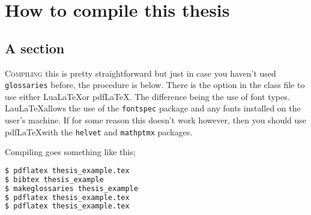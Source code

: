 
\chapter{How to compile this thesis}
\section{A section}

\lettrine{C}{ompiling} this is pretty straightforward but just in case you haven't used \texttt{glossaries} before, the procedure is below. There is the option in the class file to use either Lua\LaTeX or pdf\LaTeX. The difference being the use of font types. Lau\LaTeX allows the use of the \texttt{fontspec} package and any fonts installed on the user's machine. If for some reason this doesn't work however, then you should use pdf\LaTeX with the \texttt{helvet} and \texttt{mathptmx} packages.
\par
Compiling goes something like this;
\begin{lstlisting}[language=bash, caption=How to compile this example]
$ pdflatex thesis_example.tex
$ bibtex thesis_example
$ makeglossaries thesis_example
$ pdflatex thesis_example.tex
$ pdflatex thesis_example.tex
\end{lstlisting}

